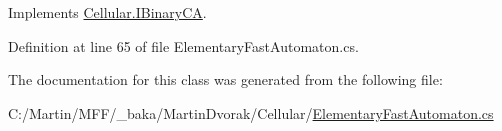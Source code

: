 Implements \hyperlink{interface_cellular_1_1_i_binary_c_a_a6a04c7374538c49df07efa176e0dd3c3}{Cellular.\+I\+Binary\+C\+A}.



Definition at line 65 of file Elementary\+Fast\+Automaton.\+cs.



The documentation for this class was generated from the following file\+:\begin{DoxyCompactItemize}
\item 
C\+:/\+Martin/\+M\+F\+F/\+\_\+baka/\+Martin\+Dvorak/\+Cellular/\hyperlink{_elementary_fast_automaton_8cs}{Elementary\+Fast\+Automaton.\+cs}\end{DoxyCompactItemize}
